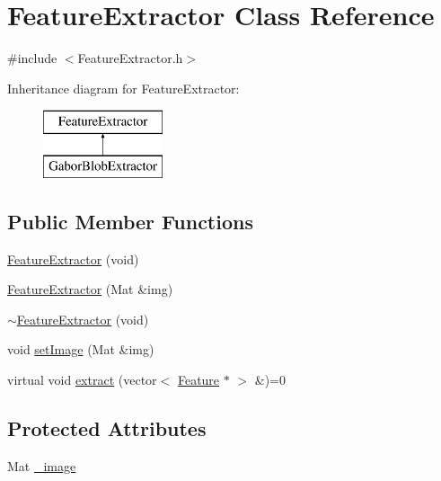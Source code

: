 \hypertarget{class_feature_extractor}{\section{Feature\+Extractor Class Reference}
\label{class_feature_extractor}
}


{\ttfamily \#include $<$Feature\+Extractor.\+h$>$}

Inheritance diagram for Feature\+Extractor\+:\begin{figure}[H]
\begin{center}
\leavevmode
\includegraphics[height=2.000000cm]{class_feature_extractor}
\end{center}
\end{figure}
\subsection*{Public Member Functions}
\begin{DoxyCompactItemize}
\item 
\hyperlink{class_feature_extractor_a20fdc922c648855f2d6e4ba98377c2c0}{Feature\+Extractor} (void)
\item 
\hyperlink{class_feature_extractor_a69618427765f959e239836106f33dc61}{Feature\+Extractor} (Mat \&img)
\item 
\hyperlink{class_feature_extractor_ab659cba0f7ca31313ebf80544400dfae}{$\sim$\+Feature\+Extractor} (void)
\item 
void \hyperlink{class_feature_extractor_a2f56319a663c984edce8b3c977bf8b89}{set\+Image} (Mat \&img)
\item 
virtual void \hyperlink{class_feature_extractor_a34507279297dcc1bc8a7ba9422da4abf}{extract} (vector$<$ \hyperlink{class_feature}{Feature} $\ast$ $>$ \&)=0
\end{DoxyCompactItemize}
\subsection*{Protected Attributes}
\begin{DoxyCompactItemize}
\item 
Mat \hyperlink{class_feature_extractor_a56fefb5d4a1d14aef973442b4bf47a62}{\+\_\+image}
\end{DoxyCompactItemize}


